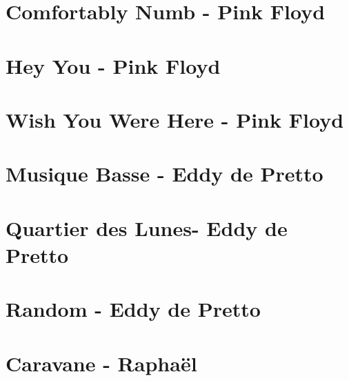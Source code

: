 \documentclass{guitartabs}
\begin{document}
\section{Comfortably Numb - Pink Floyd}
\begin{guitar}

\end{guitar}


\section{Hey You - Pink Floyd}
\begin{guitar}

\end{guitar}


\section{Wish You Were Here - Pink Floyd}
\begin{guitar}

\end{guitar}


\section{Musique Basse - Eddy de Pretto}
\begin{guitar}

\end{guitar}

\section{Quartier des Lunes- Eddy de Pretto}
\begin{guitar}

\end{guitar}

\section{Random - Eddy de Pretto}
\begin{guitar}

\end{guitar}

\section{Caravane - Raphaël}
\begin{guitar}

\end{guitar}
\end{document}
